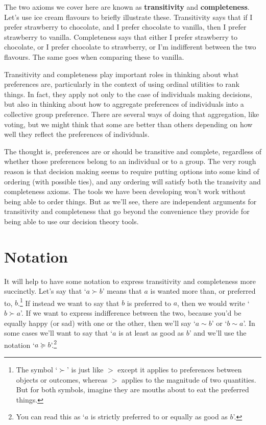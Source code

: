 \documentclass[]{tufte-book}
\begin{document}
The two axioms we cover here are known as \textbf{transitivity} and \textbf{completeness}. Let's use ice cream flavours to briefly illustrate these. Transitivity says that if I prefer strawberry to chocolate, and I prefer chocolate to vanilla, then I prefer strawberry to vanilla. Completeness says that either I prefer strawberry to chocolate, or I prefer chocolate to strawberry, or I'm indifferent between the two flavours. The same goes when comparing these to vanilla.

Transitivity and completeness play important roles in thinking about what preferences are, particularly in the context of using ordinal utilities to rank things. In fact, they apply not only to the case of individuals making decisions, but also in thinking about how to aggregate preferences of individuals into a collective group preference. There are several ways of doing that aggregation, like voting, but we might think that some are better than others depending on how well they reflect the preferences of individuals.

The thought is, preferences are or should be transitive and complete, regardless of whether those preferences belong to an individual or to a group. The very rough reason is that decision making seems to require putting options into some kind of ordering (with possible ties), and any ordering will satisfy both the transivity and completeness axioms. The tools we have been developing won't work without being able to order things. But as we'll see, there are independent arguments for transitivity and completeness that go beyond the convenience they provide for being able to use our decision theory tools.

\hypertarget{notation}{%
\section{Notation}\label{notation}}

It will help to have some notation to express transitivity and completeness more succinctly. Let's say that `\(a\succ b\)' means that \(a\) is wanted more than, or preferred to, \(b\).\footnote{The symbol `\(\succ\)' is just like \(>\) except it applies to preferences between objects or outcomes, whereas \(>\) applies to the magnitude of two quantities. But for both symbols, imagine they are mouths about to eat the preferred things.} If instead we want to say that \(b\) is preferred to \(a\), then we would write `\(b\succ a\)'. If we want to express indifference between the two, because you'd be equally happy (or sad) with one or the other, then we'll say `\(a\sim b\)' or `\(b\sim a\)'. In some cases we'll want to say that `\(a\) is at least as good as \(b\)' and we'll use the notation `\(a\succeq b\)'.\footnote{You can read this as `\(a\) is strictly preferred to or equally as good as \(b\)'.}
\end{document}
